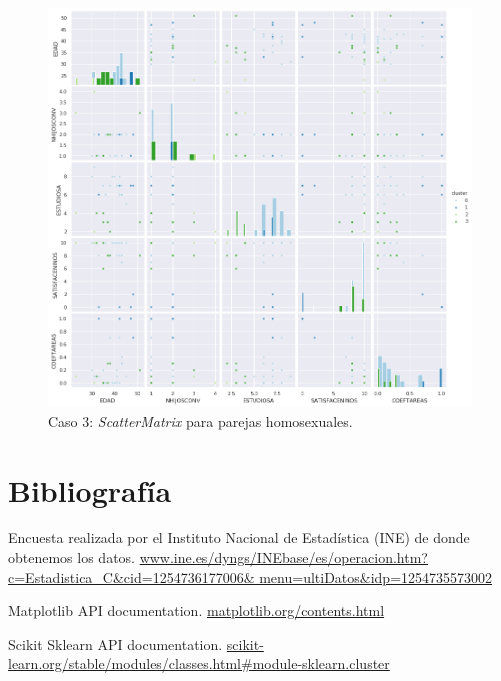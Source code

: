 \documentclass[11pt,a4paper]{article}
\begin{document}
	\begin{figure}[] 
		\centering
		\includegraphics[scale=0.5]{../Caso3/homo/scatter_matrix}
		\caption{Caso 3: \emph{ScatterMatrix} para parejas homosexuales.}
		\label{scattermatrix3homo}
	\end{figure}
	
	\section{Bibliografía}
	\begin{thebibliography}{9}
		
		Encuesta realizada por el Instituto Nacional de Estadística (INE) de donde obtenemos los datos.
		\href{https://www.ine.es/dyngs/INEbase/es/operacion.htm?c=Estadistica_C&cid=1254736177006&menu=ultiDatos&idp=1254735573002}{www.ine.es/dyngs/INEbase/es/operacion.htm?c=Estadistica\_C\&cid=1254736177006\& menu=ultiDatos\&idp=1254735573002}
		
		Matplotlib API documentation.
		\href{https://matplotlib.org/contents.html}{matplotlib.org/contents.html}
		
		Scikit Sklearn API documentation.
		\href{https://scikit-learn.org/stable/modules/classes.html#module-sklearn.cluster}{scikit-learn.org/stable/modules/classes.html\#module-sklearn.cluster}
		
	\end{thebibliography}
	
\end{document}
